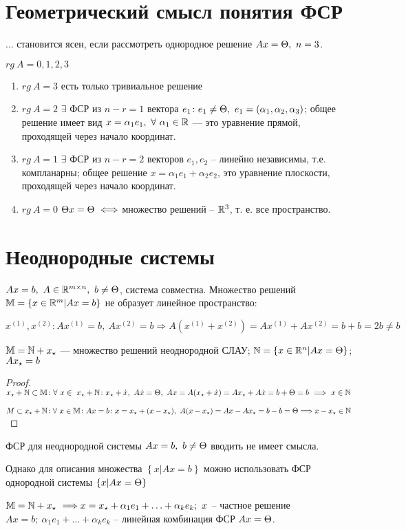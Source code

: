 \section*{Геометрический смысл понятия ФСР}
... становится ясен, если рассмотреть однородное решение $Ax=\Theta,\ n=3$.

$rg\ A=0,1,2,3$
\begin{enumerate}
\item $rg\ A=3$ \then есть только тривиальное решение
\item $rg\ A=2$ \then $\exists$ ФСР из $n-r=1$ вектора $e_1\colon e_1\neq\T,\ e_1=(\alpha_1,\alpha_2,\alpha_3)$; общее решение имеет вид $x=\alpha_1e_1,\ \forall \ \alpha_1\in\mathbb{R}$ --- это уравнение прямой, проходящей через начало координат.
\item $rg\ A=1$ \then $\exists$ ФСР из $n-r=2$ векторов $e_1,e_2$ -- линейно независимы, т.е. компланарны; общее решение $x=\alpha_1e_1+\alpha_2e_2$, это уравнение плоскости, проходящей через начало координат.
\item $rg\ A=0$ \then $\Theta x=\Theta\ \Longleftrightarrow$ множество решений -- $\mathbb{R}^3$, т. е. все пространство.
\end{enumerate}
\section{Неоднородные системы}
$Ax=b,\ A \in \R^{m\times n},\ b\neq\T$, система совместна.
Множество решений $\mathbb{M}=\left\{x\in\mathbb{R}^m|Ax=b\right\}$ не образует линейное пространство:

$x^{(1)}, x^{(2)}\colon Ax^{(1)}=b,\ Ax^{(2)}=b\Longrightarrow A(x^{(1)}+x^{(2)})=Ax^{(1)}+Ax^{(2)}=b+b=2b\neq b$
\begin{theor}
$\mathbb{M}=\mathbb{N}+x_{\star}$ --- множество решений неоднородной СЛАУ; $\mathbb{N}=\left\{x\in\mathbb{R}^n|Ax=\Theta\right\}$; $Ax_{\star}=b$
\end{theor}
\begin{proof}
$\xs+\N\subset\M\colon\forall\ x\in\ \xs+\N\colon\xs+\dot{x},\ A\dot{x}=\T,\  Ax=A(\xs+\dot{x})=A\xs+A\dot{x}=b+\T=b\ \Longrightarrow\ x\in\N$

$M\subset x_{\star}+\mathbb{N}\colon\forall\ x\in\mathbb{M}\colon Ax=b\colon x=x_{\star}+(x-x_{\star}),\ A(x-x_{\star})=Ax-Ax_{\star}=b-b=\Theta\Longrightarrow x-x_{\star}\in\mathbb{N}$
\end{proof}
ФСР для неоднородной системы $Ax=b,\ b\neq\T$ вводить не имеет смысла.

Однако для описания множества $\left\{x|Ax=b\right\}$ можно использовать ФСР однородной системы $\left\{x|Ax=\Theta\right\}$

$\mathbb{M}=\mathbb{N}+x_{\star}\ \Longrightarrow x=x_{\star}+\alpha_1e_1+\ldots+\alpha_ke_k;\ x$ -- частное решение $Ax=b;\ \alpha_1e_1+\ldots+\alpha_ke_k$ -- линейная комбинация ФСР $Ax=\Theta$.
